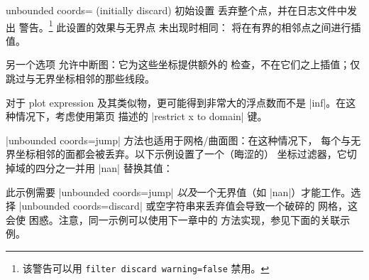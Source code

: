{\begin{pgfplotskey}{unbounded coords= (initially discard)}
    初始设置  丢弃整个点，并在日志文件中发出
    警告。\footnote{该警告可以用
    \texttt{filter discard warning=false} 禁用。} 此设置的效果与无界点
    未出现时相同：\PGFPlots{} 将在有界的相邻点之间进行插值。

    另一个选项  允许中断图：它为这些坐标提供额外的
    检查，不在它们之上插值；仅跳过与无界坐标相邻的那些线段。
\begin{codeexample}[]
\end{codeexample}

    对于 plot expression 及其类似物，更可能得到非常大的浮点数而不是
    |inf|。在这种情况下，考虑使用第\pageref{key:restrict:x:to:domain}页
    描述的 |restrict x to domain| 键。

    |unbounded coords=jump| 方法也适用于网格/曲面图：在这种情况下，
    每个与无界坐标相邻的面都会被丢弃。以下示例设置了一个（晦涩的）
    坐标过滤器，它切掉域的四分之一并用 |nan| 替换其值：

\pgfplotsexpensiveexample
\begin{codeexample}[]
\end{codeexample}
    \noindent 此示例需要
    |unbounded coords=jump|
    \emph{以及}一个无界值（如 |nan|）才能工作。选择
    |unbounded coords=discard| 或空字符串来丢弃值会导致一个破碎的
    网格，这会使 \PGFPlots{} 困惑。注意，同一示例可以使用下一章中的
    方法实现，参见下面的关联示例。
\end{pgfplotskey}


}
